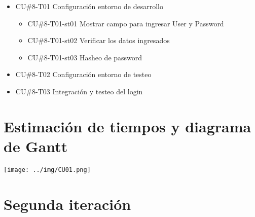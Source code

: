 \begin{enumerate}

\begin{itemize}
    \item CU\#8-T01 Configuración entorno de desarrollo
    \begin{itemize}
        \item CU\#8-T01-st01 Mostrar campo para ingresar User y Password
        \item CU\#8-T01-st02 Verificar los datos ingresados
        \item CU\#8-T01-st03 Hasheo de password
    \end{itemize}
    \item CU\#8-T02 Configuración entorno de testeo
    \item CU\#8-T03 Integración y testeo del login
\end{itemize}

\section{Estimación de tiempos y diagrama de Gantt}

\texttt{[image: ../img/CU01.png]}\\


\section{Segunda iteración}
       








\end{enumerate}
